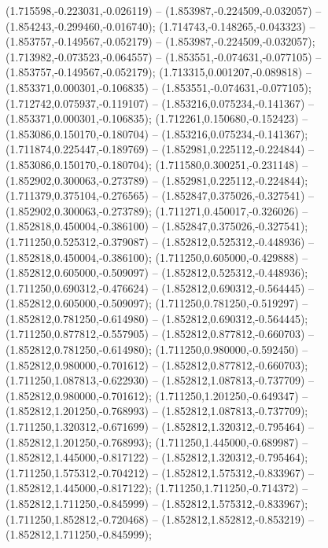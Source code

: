  (1.715598,-0.223031,-0.026119) -- (1.853987,-0.224509,-0.032057) -- (1.854243,-0.299460,-0.016740);
 (1.714743,-0.148265,-0.043323) -- (1.853757,-0.149567,-0.052179) -- (1.853987,-0.224509,-0.032057);
 (1.713982,-0.073523,-0.064557) -- (1.853551,-0.074631,-0.077105) -- (1.853757,-0.149567,-0.052179);
 (1.713315,0.001207,-0.089818) -- (1.853371,0.000301,-0.106835) -- (1.853551,-0.074631,-0.077105);
 (1.712742,0.075937,-0.119107) -- (1.853216,0.075234,-0.141367) -- (1.853371,0.000301,-0.106835);
 (1.712261,0.150680,-0.152423) -- (1.853086,0.150170,-0.180704) -- (1.853216,0.075234,-0.141367);
 (1.711874,0.225447,-0.189769) -- (1.852981,0.225112,-0.224844) -- (1.853086,0.150170,-0.180704);
 (1.711580,0.300251,-0.231148) -- (1.852902,0.300063,-0.273789) -- (1.852981,0.225112,-0.224844);
 (1.711379,0.375104,-0.276565) -- (1.852847,0.375026,-0.327541) -- (1.852902,0.300063,-0.273789);
 (1.711271,0.450017,-0.326026) -- (1.852818,0.450004,-0.386100) -- (1.852847,0.375026,-0.327541);
 (1.711250,0.525312,-0.379087) -- (1.852812,0.525312,-0.448936) -- (1.852818,0.450004,-0.386100);
 (1.711250,0.605000,-0.429888) -- (1.852812,0.605000,-0.509097) -- (1.852812,0.525312,-0.448936);
 (1.711250,0.690312,-0.476624) -- (1.852812,0.690312,-0.564445) -- (1.852812,0.605000,-0.509097);
 (1.711250,0.781250,-0.519297) -- (1.852812,0.781250,-0.614980) -- (1.852812,0.690312,-0.564445);
 (1.711250,0.877812,-0.557905) -- (1.852812,0.877812,-0.660703) -- (1.852812,0.781250,-0.614980);
 (1.711250,0.980000,-0.592450) -- (1.852812,0.980000,-0.701612) -- (1.852812,0.877812,-0.660703);
 (1.711250,1.087813,-0.622930) -- (1.852812,1.087813,-0.737709) -- (1.852812,0.980000,-0.701612);
 (1.711250,1.201250,-0.649347) -- (1.852812,1.201250,-0.768993) -- (1.852812,1.087813,-0.737709);
 (1.711250,1.320312,-0.671699) -- (1.852812,1.320312,-0.795464) -- (1.852812,1.201250,-0.768993);
 (1.711250,1.445000,-0.689987) -- (1.852812,1.445000,-0.817122) -- (1.852812,1.320312,-0.795464);
 (1.711250,1.575312,-0.704212) -- (1.852812,1.575312,-0.833967) -- (1.852812,1.445000,-0.817122);
 (1.711250,1.711250,-0.714372) -- (1.852812,1.711250,-0.845999) -- (1.852812,1.575312,-0.833967);
 (1.711250,1.852812,-0.720468) -- (1.852812,1.852812,-0.853219) -- (1.852812,1.711250,-0.845999);
